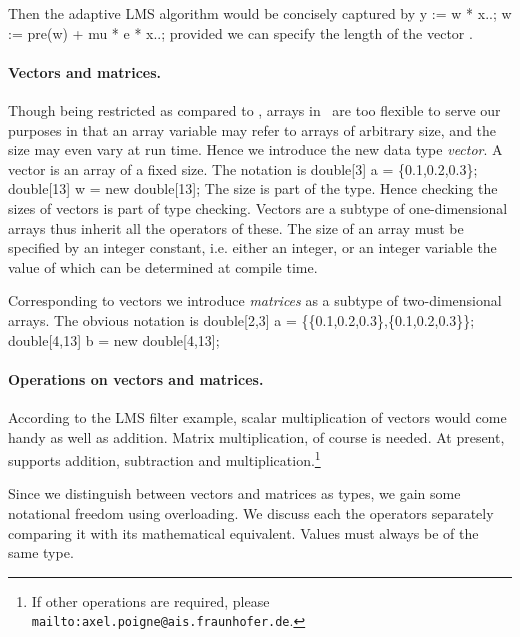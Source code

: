 Then the adaptive LMS algorithm would be concisely captured by
%
\BEP
y := w * x..;
w := pre(w) + mu * e * x..;
\EEP
%
provided we can specify the length of the vector . 


\paragraph{Vectors and matrices.} Though being restricted as compared to \java,
arrays in \se\ are too flexible to serve our purposes in that an array variable 
may refer to arrays of arbitrary size, and the size may even vary at run time.
Hence we introduce the new data type \textit{vector}. A vector is an array of a
fixed size. The notation is
%
\BEP
double[3]  a = \{0.1,0.2,0.3\};
double[13] w = new double[13];
\EEP
%
The size is part of the type. Hence checking the sizes of vectors is part of type 
checking. Vectors are a subtype of one-dimensional arrays thus inherit
all the operators of these. The size of an array must be specified by an integer
constant, i.e. either an integer, or an integer variable the value of which can be determined at compile time.  

Corresponding to vectors we introduce \textit{matrices} as a subtype of two-dimensional
arrays. The obvious notation is
%
\BEP
double[2,3]  a = \{\{0.1,0.2,0.3\},\{0.1,0.2,0.3\}\};
double[4,13] b = new double[4,13];
\EEP
%

\paragraph{Operations on vectors and matrices.} According to the LMS filter 
example, scalar multiplication of vectors would come handy as well as addition. Matrix multiplication, of course is needed. At present, \se supports addition, subtraction 
and multiplication.\footnote{If other operations are required, please
 \texttt{mailto:axel.poigne@ais.fraunhofer.de}.} 

Since we distinguish between vectors and matrices as types, we gain some notational freedom using overloading. We discuss each the operators separately comparing it
with its mathematical equivalent. Values must always be of the same type.

